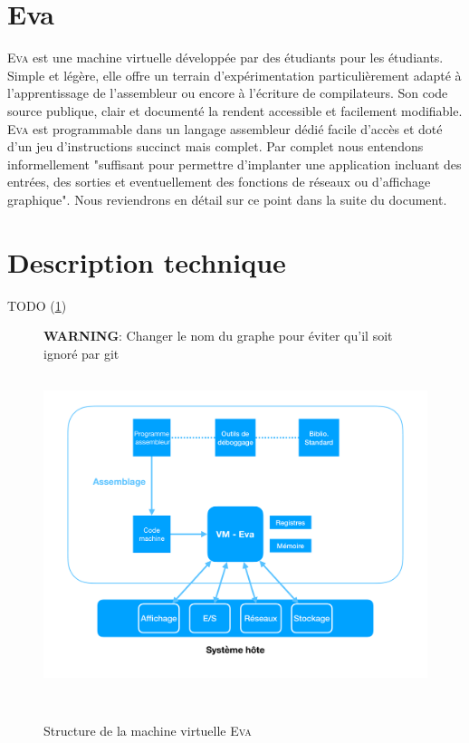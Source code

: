 \documentclass[11pt,twoside,french]{article}
\newcommand{\noun}[1]{\textsc{#1}}
\newcommand{\noun}[1]{\textsc{#1}}
\begin{document}
\vfill{}
\newpage{}

\section{Eva}

\noun{Eva} est une machine virtuelle développée par des étudiants pour les
étudiants. Simple et légère, elle offre un terrain d'expérimentation
particulièrement adapté à l'apprentissage de l'assembleur ou encore
à l'écriture de compilateurs. Son code source publique, clair et documenté
la rendent accessible et facilement modifiable. \noun{Eva} est programmable
dans un langage assembleur dédié facile d'accès et doté d'un jeu d'instructions
succinct mais complet. Par complet nous entendons informellement "suffisant pour permettre d'implanter une application incluant des entrées, des sorties et eventuellement des fonctions de réseaux ou d'affichage graphique". Nous reviendrons en détail sur ce point dans la suite du document.

\vfill{}

\section{Description technique}


TODO (\ref{fig:diagram1})


\begin{figure}[b]
  \centering
  \textbf{WARNING}: Changer le nom du graphe pour éviter qu'il soit ignoré par git
  \includegraphics[height=10cm, keepaspectratio]{diagram1_graph.pdf}
  \caption{Structure de la machine virtuelle \noun{Eva}}
  \label{fig:diagram1}
\end{figure}
\end{document}
